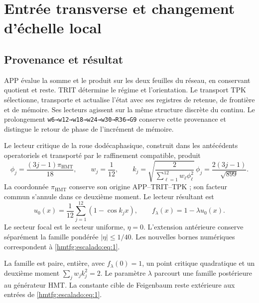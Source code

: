 \section{Entrée transverse et changement d’échelle local}
\label{hmtfg:fragmento:entrada-transversal-y-escalado-local}

\subsection{Provenance et résultat}
\label{hmtfg:escalado:1}

APP évalue la somme et le produit sur les deux feuilles du réseau, en conservant quotient et reste. TRIT détermine le régime et l’orientation. Le transport TPK sélectionne, transporte et actualise l’état avec ses registres de retenue, de frontière et de mémoire. Ses lecteurs agissent sur la même structure discrète du continu. Le prolongement \texttt{w6→w12→w18→w24→w30→R36→G9} conserve cette provenance et distingue le retour de phase de l’incrément de mémoire.

Le lecteur critique de la roue dodécaphasique, construit dans les antécédents operatoriels et transporté par le raffinement compatible, produit
\[
\phi_j=\frac{(3j-1)\pi_{\mathrm{HMT}}}{18},\qquad
w_j=\frac1{12},\qquad
k_j=\sqrt{\frac2{\sum_{\ell=1}^{12}w_\ell\phi_\ell^2}}\,\phi_j
=\frac{2(3j-1)}{\sqrt{899}}.
\]
La coordonnée \(\pi_{\mathrm{HMT}}\) conserve son origine APP–TRIT–TPK ; son facteur commun s’annule dans ce deuxième moment. Le lecteur résultant est
\begin{equation}
u_0(x)=\frac1{12}\sum_{j=1}^{12}(1-\cos k_jx),\qquad
f_\lambda(x)=1-\lambda u_0(x).
\label{hmtfg:escalado:eq:1}
\end{equation}
Le secteur focal est le secteur uniforme, \(\eta=0\). L’extension antérieure conserve séparément la famille pondérée \(|\eta|\le1/40\). Les nouvelles bornes numériques correspondent à \eqref{hmtfg:escalado:eq:1}.

La famille est paire, entière, avec \(f_\lambda(0)=1\), un point critique quadratique et un deuxième moment \(\sum_jw_jk_j^2=2\). Le paramètre \(\lambda\) parcourt une famille postérieure au générateur HMT. La constante cible de Feigenbaum reste extérieure aux entrées de \eqref{hmtfg:escalado:eq:1}.

